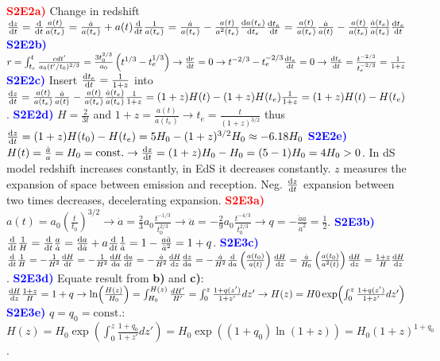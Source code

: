 \documentclass[landscape, a4paper,1pt,english]{article}
\title{}
\author{}
\begin{document}
{ {\footnotesize {\tiny
\begin{multicols}{5}
\textcolor{red}{\textbf{S2E2a)}} Change in redshift $\dv{z}{t} = \dv{t}\frac{a(t)}{a(t_e)} = \frac{\dot{a}}{a(t_e)} + a(t)\dv{t}\frac{1}{a(t_e)} = \frac{\dot{a}}{a(t_e)} - \frac{a(t)}{a^2(t_e)}\dv{a(t_e)}{t_e}\dv{t_e}{t} = \frac{a(t)}{a(t_e)}\frac{\dot{a}}{a(t)} - \frac{a(t)}{a(t_e)}\frac{\dot{a}(t_e)}{a(t_e)}\dv{t_e}{t}$
\textcolor{blue}{\textbf{S2E2b)}} $r = \int_{t_e}^{t}\frac{cdt'}{a_0(t'/t_0)^{2/3}} = \frac{3t_0^{2/3}}{a_0}\left(t^{1/3} - t_e^{1/3}\right)\rightarrow\dv{r}{t} = 0\rightarrow t^{-2/3} - t_e^{-2/3}\dv{t_e}{t} =0\rightarrow \dv{t_e}{t} = \frac{t^{-2/3}}{t_e^{-2/3}} = \frac{1}{1+z}$
\textcolor{blue}{\textbf{S2E2c)}} Insert $\dv{t_e}{t} = \frac{1}{1+z}$ into $\dv{z}{t} = \frac{a(t)}{a(t_e)}\frac{\dot{a}}{a(t)} - \frac{a(t)}{a(t_e)}\frac{\dot{a}(t_e)}{a(t_e)}\frac{1}{1+z} = (1+z)H(t) - (1+z)H(t_e)\frac{1}{1+z} = (1+z)H(t) - H(t_e)$.
\textcolor{blue}{\textbf{S2E2d)}} $H = \frac{2}{3t}$ and $1+z = \frac{a(t)}{a(t_e)}\rightarrow t_e = \frac{t}{(1+z)^{3/2}}$ thus $\dv{z}{t}(t_0) = (1 + z)H(t_0) - H(t_e) = 5H_0 - (1+z)^{3/2}H_0 \approx -6.18 H_0$
\textcolor{blue}{\textbf{S2E2e)}} $H(t) = \frac{\dot{a}}{a} = H_0 = \text{const.}\rightarrow \dv{z}{t} = (1+z)H_0 - H_0 = (5-1)H_0 = 4H_0>0$. In dS model redshift increases constantly, in EdS it decreases constantly. $z$ measures the expansion of space between emission and reception. Neg. $\dv{z}{t}$ expansion between two times decreases, decelerating expansion.
\textcolor{red}{\textbf{S2E3a)}} $a(t) = a_0\left(\frac{t}{t_0}\right)^{3/2}\rightarrow\dot{a} = \frac{2}{3}a_0\frac{t^{-1/3}}{t_0^{2/3}}\rightarrow \ddot{a} = -\frac{2}{9}a_0\frac{t^{-4/3}}{t_0^{2/3}}\rightarrow q = -\frac{\ddot{a}a}{\dot{a}^2} = \frac{1}{2}$.
\textcolor{blue}{\textbf{S2E3b)}}$\dv{t}\frac{1}{H} = \dv{t}\frac{a}{\dot{a}} = \dv{a}{\dot{a}} + a\dv{t}\frac{1}{\dot{a}} = 1 - \frac{a\ddot{a}}{\dot{a}^2} = 1+q$.
\textcolor{blue}{\textbf{S2E3c)}} $\dv{t}\frac{1}{H} = -\frac{1}{H^2}\dv{H}{t} = -\frac{1}{H^2}\dv{H}{a}\dv{a}{t} =- \frac{\dot{a}}{H^2}\dv{H}{z}\dv{z}{a} = -\frac{\dot{a}}{H^2}\dv{a}\left(\frac{a(t_0)}{a(t)}\right)\dv{H}{z} = \frac{\dot{a}}{H_0}\left(\frac{a(t_0)}{a^2(t)}\right)\dv{H}{z} = \frac{1+z}{H}\dv{H}{z}$.
\textcolor{blue}{\textbf{S2E3d)}} Equate result from \textbf{b)} and \textbf{c)}: $\dv{H}{z}\frac{1+z}{H} = 1+q\rightarrow\ln(\frac{H(z)}{H_0}) = \int_{H_0}^{H(z)}\frac{dH'}{H'} = \int_{0}^{z}\frac{1+q(z')}{1+z'}dz'\rightarrow H(z) = H0\exp(\int_{0}^{z}\frac{1+q(z')}{1+z'}dz')$
\textcolor{blue}{\textbf{S2E3e)}} $q = q_0 =\text{const.}$: $H(z) = H_0\exp(\int_{0}^{z}\frac{1+q_0}{1+z'}dz') = H_0\exp((1+q_0)\ln(1+z)) = H_0(1+z)^{1+q_0}$.

\end{multicols}}}}
\end{document}
